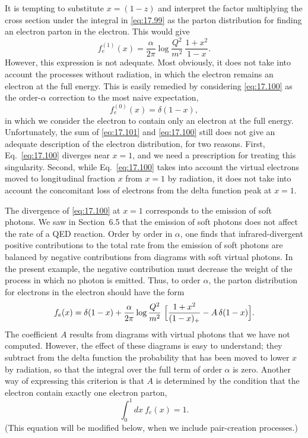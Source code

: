 It is tempting to substitute $x = (1-z)$ and interpret the factor multiplying
the cross section under the integral in \eqref{eq:17.99} as the parton
distribution for finding an electron parton in the electron.  This would give
\begin{equation}
  f^{(1)}_e(x) = \frac{\alpha}{2\pi}\log\frac{Q^2}{m^2}\ \frac{1+x^2}{1-x}
  .
  \label{eq:17.100}
\end{equation}
However, this expression is not adequate.  Most obviously, it does not take
into account the processes without radiation, in which the electron remains
an electron at the full energy.  This is easily remedied by considering
\eqref{eq:17.100} as the order-$\alpha$ correction to the most naive
expectation,
\begin{equation}
  f^{(0)}_e(x) = \delta(1-x) ,
  \label{eq:17.101}
\end{equation}
in which we consider the electron to contain only an electron at the full
energy.  Unfortunately, the sum of \eqref{eq:17.101} and \eqref{eq:17.100}
still does not give an adequate description of the electron distribution, for
two reasons.  First, Eq.~\eqref{eq:17.100} diverges near $x = 1$, and we need
a prescription for treating this singularity.  Second, while Eq.~\eqref{eq:17.100}
takes into account the virtual electrons moved to longitudinal fraction $x$
from $x = 1$ by radiation, it does not take into account the concomitant loss
of electrons from the delta function peak at $x = 1$.

The divergence of \eqref{eq:17.100} at $x = 1$ corresponds to the emission of
soft photons.  We saw in Section~6.5 that the emission of soft photons does
not affect the rate of a QED reaction.  Order by order in $\alpha$, one finds
that infrared-divergent positive contributions to the total rate from the
emission of soft photons are balanced by negative contributions from diagrams
with soft virtual photons.  In the present example, the negative contribution
must decrease the weight of the process in which no photon is emitted.
Thus, to order $\alpha$, the parton distribution for electrons in the electron
should have the form
\begin{equation}
  f_e(x) = \delta(1-x) + \frac{\alpha}{2\pi}\log\frac{Q^2}{m^2}\ \Bigl[
    \frac{1+x^2}{(1-x)_+} - A\,\delta(1-x) \Bigr] .
  \label{eq:17.102}
\end{equation}
The coefficient $A$ results from diagrams with virtual photons that we have
not computed.  However, the effect of these diagrams is easy to understand;
they subtract from the delta function the probability that has been moved to
lower $x$ by radiation, so that the integral over the full term of order
$\alpha$ is zero.  Another way of expressing this criterion is that $A$ is
determined by the condition that the electron contain exactly one electron
parton,
\begin{equation}
  \int_0^1 dx\ f_e(x) = 1 .
  \label{eq:17.103}
\end{equation}
(This equation will be modified below, when we include pair-creation
processes.)

